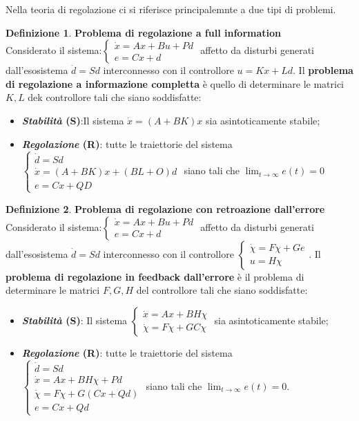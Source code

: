 \documentclass{article}
\theoremstyle{definition}
\newtheorem{definition}{\textbf{Definizione}}
\begin{document}
Nella teoria di regolazione ci si riferisce principalemnte a due tipi di problemi.
\begin{definition}{\textbf{Problema di regolazione a full information}}\\
	Considerato il sistema:\(\begin{cases}
		\dot{x}=Ax+Bu+Pd \\
		e=Cx+d
	\end{cases}\) affetto da disturbi generati dall'esosistema \(\dot{d}=Sd\) interconnesso con il controllore \(u=K x+L d\). Il \textbf{problema di regolazione a informazione completta} è quello di determinare le matrici \(K,L\) dek controllore tali che siano soddisfatte:
    \begin{itemize}
		\item \textbf{\emph{Stabilità} (S)}:Il sistema \(\dot{x}=(A+BK)x\) sia asintoticamente stabile;
		\item \textbf{\emph{Regolazione} (R)}: tutte le traiettorie del sistema \(\begin{cases}
			      \dot{d}=Sd              \\
			      \dot{x}=(A+BK)x+(BL+O)d \\
			      e=Cx+QD
		      \end{cases}\) siano tali che \(\lim_{t\rightarrow\infty}e(t)=0\)
	\end{itemize}
\end{definition}
\begin{definition}{\textbf{Problema di regolazione con retroazione dall'errore}}\\
    Considerato il sistema:\(\begin{cases}
		\dot{x}=Ax+Bu+Pd \\
		e=Cx+d
	\end{cases}\) affetto da disturbi generati dall'esosistema \(\dot{d}=Sd\) interconnesso con il controllore \(\begin{cases}
        \dot{\chi}=F\chi + Ge\\
        u=H\chi
    \end{cases}\). Il \textbf{problema di regolazione in feedback dall'errore} è il problema di determinare le matrici \(F,G,H\) del controllore tali che siano soddisfatte:
    \begin{itemize}
        \item \textbf{\emph{Stabilità} (S)}: Il sistema \(\begin{cases}
            \dot{x}=Ax+BH\chi \\
            \dot{\chi}=F\chi+GC\chi
        \end{cases}\) sia asintoticamente stabile;
        \item \textbf{\emph{Regolazione} (R)}: tutte le traiettorie del sistema \(\begin{cases}
            \dot{d}=Sd\\
            \dot{x}=Ax+BH\chi+Pd \\
            \dot{\chi}=F\chi+G(Cx+Qd)\\
            e=Cx+Qd
        \end{cases}\) siano tali che  \(\lim_{t\rightarrow\infty}e(t)=0\).
    \end{itemize}
\end{definition}
\end{document}
